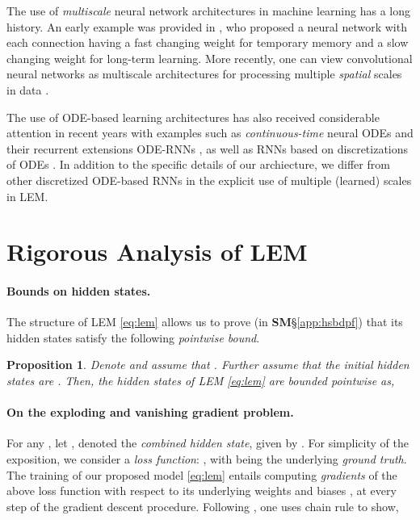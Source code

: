 \documentclass{article} \usepackage{iclr2022_conference,times}
\newtheorem{proposition}[theorem]{Proposition}
\begin{document}
The use of \emph{multiscale} neural network architectures in machine learning has a long history. 
An early example was provided in \citet{HinPla}, who proposed a neural network with each connection having a fast changing weight for temporary memory and a slow changing weight for long-term learning. 
More recently, one can view convolutional neural networks as multiscale architectures for processing multiple \emph{spatial} scales in data \citep{Kolter}. 

The use of ODE-based learning architectures has also received considerable attention in recent years with examples such as \emph{continuous-time} neural ODEs \citep{neuralODE,continuousnet_TR,queiruga2021compressing} and their recurrent extensions ODE-RNNs \citep{ode_rnn}, as well as RNNs based on discretizations of ODEs \citep{anti,lip_rnn,srnn,lim2021noisy,coRNN,unicornn}. In addition to the specific details of our archiecture, we differ from other discretized ODE-based RNNs in the explicit use of multiple (learned) scales in LEM. 





\section{Rigorous Analysis of LEM}
\label{sec:rig}
\paragraph{Bounds on hidden states.} 
The structure of LEM \eqref{eq:lem} allows us to prove (in {\bf SM}\S\ref{app:hsbdpf}) that its hidden states satisfy the following \emph{pointwise bound}.
\begin{proposition}
\label{prop:1}
Denote  and assume that . Further assume that the initial hidden states are .
Then, the hidden states  of LEM \eqref{eq:lem} are bounded pointwise as,

\end{proposition}

\paragraph{On the exploding and vanishing gradient problem.} 
For any , let , denoted the \emph{combined hidden state}, given by . 
For simplicity of the exposition, we 
consider a \emph{loss function}: , with  being the underlying \emph{ground truth}. The training of our proposed model \eqref{eq:lem} entails computing \emph{gradients} of the above loss function with respect to its underlying weights and biases ,
at every step of the gradient descent procedure. Following \cite{vanish_grad}, one uses chain rule to show,
\end{document}
